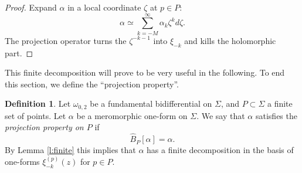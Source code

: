 \documentclass[reqno,oneside,11pt]{amsart}
\theoremstyle{plain}
\theoremstyle{definition}
\newtheorem{definition}[theorem]{Definition}
\theoremstyle{remark}
\numberwithin{equation}{section}
\begin{document}
\begin{proof}
Expand $\alpha$ in a local coordinate $\zeta$ at $p \in P$:
\begin{equation}
\alpha \simeq \sum_{k=-M}^\infty \alpha_k \zeta^{k} d \zeta.
\end{equation}
The projection operator turns the $\zeta^{-k-1}$ into $\xi_{-k}$ and kills the holomorphic part.
\end{proof}
This finite decomposition will prove to be very useful in the following. To end this section, we define the ``projection property''.

\begin{definition}\label{d:projprop1}
Let $\omega_{0,2}$ be a fundamental bidifferential on $\Sigma$, and $P \subset \Sigma$ a finite set of points. Let $\alpha$ be a meromorphic one-form on $\Sigma$. We say that $\alpha$ satisfies the \emph{projection property on $P$} if
\begin{equation}
\hat{B}_P[\alpha] = \alpha.
\end{equation}
By Lemma \ref{l:finite} this implies that $\alpha$ has a finite decomposition in the basis of one-forms $\xi_{-k}^{(p)}(z)$ for $p \in P$.
\end{definition}
\end{document}
